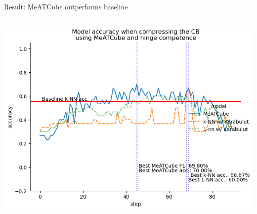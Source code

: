 \documentclass[]{beamer}
\begin{document}
\begin{frame}{Result: MeATCube outperforms baseline}
\begin{columns}
\begin{column}{.65\textwidth}
            \includegraphics[width=.8\textwidth]{../results-weight-estim+/figs/kaggle+teaching+assistant+evaluation.png}
        \end{column}
    \end{columns}
\end{frame}
\end{document}
